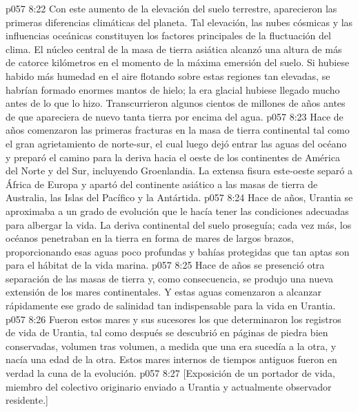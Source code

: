 \vs p057 8:22 Con este aumento de la elevación del suelo terrestre, aparecieron las primeras diferencias climáticas del planeta. Tal elevación, las nubes cósmicas y las influencias oceánicas constituyen los factores principales de la fluctuación del clima. El núcleo central de la masa de tierra asiática alcanzó una altura de más de catorce kilómetros en el momento de la máxima emersión del suelo. Si hubiese habido más humedad en el aire flotando sobre estas regiones tan elevadas, se habrían formado enormes mantos de hielo; la era glacial hubiese llegado mucho antes de lo que lo hizo. Transcurrieron algunos cientos de millones de años antes de que apareciera de nuevo tanta tierra por encima del agua.
\vs p057 8:23 \pc Hace  de años comenzaron las primeras fracturas en la masa de tierra continental tal como el gran agrietamiento de norte\hyp{}sur, el cual luego dejó entrar las aguas del océano y preparó el camino para la deriva hacia el oeste de los continentes de América del Norte y del Sur, incluyendo Groenlandia. La extensa fisura este\hyp{}oeste separó a África de Europa y apartó del continente asiático a las masas de tierra de Australia, las Islas del Pacífico y la Antártida.
\vs p057 8:24 \pc Hace  de años, Urantia se aproximaba a un grado de evolución que le hacía tener las condiciones adecuadas para albergar la vida. La deriva continental del suelo proseguía; cada vez más, los océanos penetraban en la tierra en forma de mares de largos brazos, proporcionando esas aguas poco profundas y bahías protegidas que tan aptas son para el hábitat de la vida marina.
\vs p057 8:25 \pc Hace  de años se presenció otra separación de las masas de tierra y, como consecuencia, se produjo una nueva extensión de los mares continentales. Y estas aguas comenzaron a alcanzar rápidamente ese grado de salinidad tan indispensable para la vida en Urantia.
\vs p057 8:26 Fueron estos mares y sus sucesores los que determinaron los registros de vida de Urantia, tal como después se descubrió en páginas de piedra bien conservadas, volumen tras volumen, a medida que una era sucedía a la otra, y nacía una edad de la otra. Estos mares internos de tiempos antiguos fueron en verdad la cuna de la evolución.
\vsetoff
\vs p057 8:27 [Exposición de un portador de vida, miembro del colectivo originario enviado a Urantia y actualmente observador residente.]
